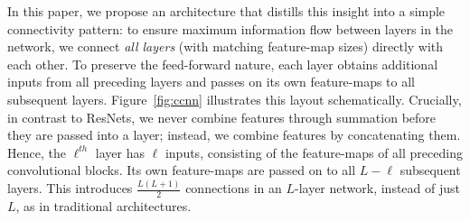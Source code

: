 In this paper, we propose an architecture that distills this insight into a simple connectivity pattern: to ensure maximum information flow between layers in the network, we connect \emph{all layers} (with matching feature-map sizes) directly with each other. To preserve the feed-forward nature, each layer obtains additional inputs from all preceding layers and passes on its own feature-maps to all subsequent layers.
Figure~\ref{fig:ccnn} illustrates this layout schematically.
Crucially, in contrast to ResNets, we never combine features through summation before they are passed into a layer; instead, we combine features by concatenating them.
Hence, the $\ell^{th}$ layer has $\ell$ inputs, consisting of the feature-maps of all preceding convolutional blocks. Its own feature-maps are passed on to all $L-\ell$ subsequent layers. This introduces $\frac{L(L+1)}{2}$  connections in an $L$-layer network, instead of just $L$, as in traditional architectures.
